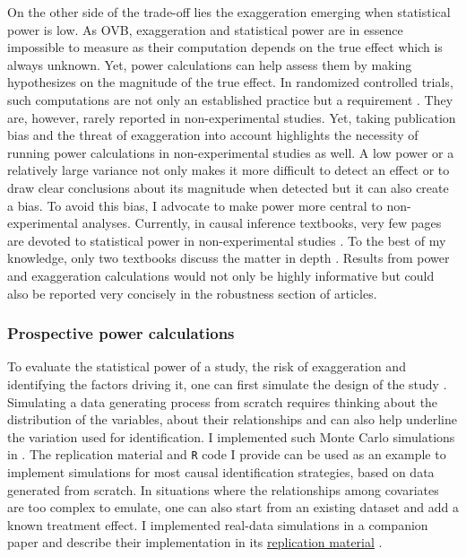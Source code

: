\documentclass[usletter, 12pt]{article}
\begin{document}
			On the other side of the trade-off lies the exaggeration emerging when statistical power is low. As OVB, exaggeration and statistical power are in essence impossible to measure as their computation depends on the true effect which is always unknown. Yet, power calculations can help assess them by making hypothesizes on the magnitude of the true effect. In randomized controlled trials, such computations are not only an established practice but a requirement \citep{duflo_using_2007, mcconnell_going_2015, athey_econometrics_2016}. They are, however, rarely reported in non-experimental studies. %
			Yet, taking publication bias and the threat of exaggeration into account highlights the necessity of running power calculations in non-experimental studies as well. A low power or a relatively large variance not only makes it more difficult to detect an effect or to draw clear conclusions about its magnitude when detected but it can also create a bias. To avoid this bias, I advocate to make power more central to non-experimental analyses. Currently, in causal inference textbooks, very few pages are devoted to statistical power in non-experimental studies \citep{angrist_mostly_2009, angrist_mastering_2014, imbens_causal_2015, cunningham_causal_2021}. To the best of my knowledge, only two textbooks discuss the matter in depth \citep{shadish_experimental_2002, huntington-klein_effect_2021}. Results from power and exaggeration calculations would not only be highly informative but could also be reported very concisely in the robustness section of articles. 
			
			\subsubsection{Prospective power calculations}
						
				To evaluate the statistical power of a study, the risk of exaggeration and identifying the factors driving it, one can first simulate the design of the study \citep{hill_bayesian_2011, gelman_regression_2020, black_simulated_2021}. %
				Simulating a data generating process from scratch requires thinking about the distribution of the variables, about their relationships and can also help underline the variation used for identification. %
			 I implemented such Monte Carlo simulations in . The replication material and \verb?R? code I provide can be used as an example to implement simulations for most causal identification strategies, based on data generated from scratch. In situations where the relationships among covariates are too complex to emulate, one can also start from an existing dataset and add a known treatment effect. I implemented real-data simulations in a companion paper and describe their implementation in its \href{https://vincentbagilet.github.io/inference_pollution/}{replication material} \citep{bagilet_accurately_2023}. 
			 
\end{document}

